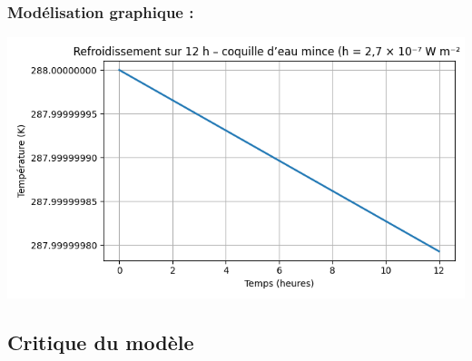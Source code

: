 \documentclass[a4paper,12pt]{article}
\begin{document}
\subsubsection*{Modélisation graphique :} 
\begin{center}
  \includegraphics[width=0.8\linewidth]{../modele2/figures/modele2_coquille.png}
\end{center}
        


\subsection*{Critique du modèle}
\end{document}
